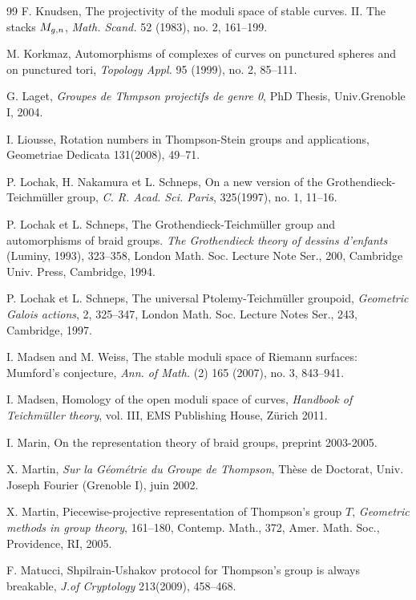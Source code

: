 \documentclass[twoside]{irmaems}
\theoremstyle{plain}
\theoremstyle{definition}
\theoremstyle{remark}
\begin{document}
\begin{small}
\begin{thebibliography}{99}
 F. Knudsen, { The projectivity of the moduli space of
stable curves. II. The stacks $M\sb{g,n}$}, {\em  Math. Scand.} 52 (1983), no. 2,
161--199.

 M. Korkmaz,{ Automorphisms of complexes of curves on punctured spheres and on punctured tori},  {\em   Topology Appl.}  95  (1999),  no. 2, 85--111.


G. Laget, {\em Groupes de Thmpson projectifs de genre 0}, 
PhD Thesis, Univ.Grenoble I, 2004. 
     

I. Liousse, Rotation numbers in Thompson-Stein groups and applications,
   Geometriae Dedicata 131(2008), 49--71.


P. Lochak,  H. Nakamura et L. Schneps,          
{ On a new version of the Grothendieck-Teichm\"uller group},         
{\em  C. R. Acad. Sci. Paris},  325(1997), no. 1, 11--16.       

P. Lochak et L. Schneps, { The Grothendieck-Teichm\"uller group and automorphisms of braid
groups.} {\em  The Grothendieck theory of dessins d'enfants} (Luminy, 1993), 323--358, London Math. Soc. Lecture Note
Ser., 200, Cambridge Univ. Press, Cambridge, 1994.
 

   P. Lochak et L. Schneps, { The universal Ptolemy-Teichm\"uller groupoid},          
{\em  Geometric Galois actions}, 2, 325--347, London Math. Soc. Lecture         
Notes Ser., 243, Cambridge, 1997.

I. Madsen and M. Weiss, { The stable moduli space of Riemann surfaces: Mumford's conjecture}, {\em   Ann. of Math.} (2)  165  (2007),  no. 3, 843--941.


I. Madsen, { Homology of the open moduli space of curves}, 
{\em  Handbook of Teichm\"uller theory}, vol. III, EMS Publishing House, Z\"urich 2011. 


I. Marin,
 { On the representation theory of braid groups}, preprint 2003-2005.

 X. Martin, {\em Sur la G\'eom\'etrie du Groupe de Thompson}, Th\`ese de Doctorat, Univ. Joseph Fourier (Grenoble I), juin 2002.

 X. Martin, { Piecewise-projective representation of Thompson's group $T$},  {\em  Geometric methods in group theory},  161--180, Contemp. Math., 372, Amer. Math. Soc., Providence, RI, 2005.    


F. Matucci, {Shpilrain-Ushakov protocol for Thompson's group is always
breakable}, {\em J.of Cryptology} 213(2009), 458--468. 


\end{thebibliography}
\end{small}
\end{document}
